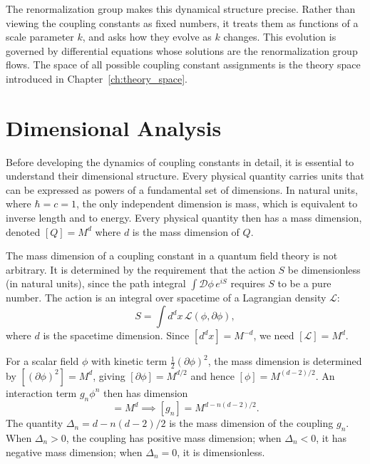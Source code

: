 \documentclass[11pt, twoside, openright]{book}
\theoremstyle{dotted}
\theoremstyle{definition}
\begin{document}
The renormalization group makes this dynamical structure precise. Rather than
viewing the coupling constants as fixed numbers, it treats them as functions of a
scale parameter $k$, and asks how they evolve as $k$ changes. This evolution is
governed by differential equations whose solutions are the renormalization group
flows. The space of all possible coupling constant assignments is the theory space
introduced in Chapter~\ref{ch:theory_space}.

\section{Dimensional Analysis}
\label{sec:dimensional_analysis}

Before developing the dynamics of coupling constants in detail, it is essential to
understand their dimensional structure. Every physical quantity carries units that
can be expressed as powers of a fundamental set of dimensions. In natural units,
where $\hbar = c = 1$, the only independent dimension is mass, which is equivalent
to inverse length and to energy. Every physical quantity then has a mass dimension,
denoted $[Q] = M^d$ where $d$ is the mass dimension of $Q$.

The mass dimension of a coupling constant in a quantum field theory is not
arbitrary. It is determined by the requirement that the action $S$ be dimensionless
(in natural units), since the path integral $\int \mathcal{D}\phi \, e^{iS}$
requires $S$ to be a pure number. The action is an integral over spacetime of a
Lagrangian density $\mathcal{L}$:
\begin{equation}
  S = \int d^dx \, \mathcal{L}(\phi, \partial\phi),
\end{equation}
where $d$ is the spacetime dimension. Since $[d^dx] = M^{-d}$, we need
$[\mathcal{L}] = M^d$.

For a scalar field $\phi$ with kinetic term $\frac{1}{2}(\partial\phi)^2$, the
mass dimension is determined by $[(\partial\phi)^2] = M^d$, giving
$[\partial\phi] = M^{d/2}$ and hence $[\phi] = M^{(d-2)/2}$. An interaction term
$g_n \phi^n$ then has dimension
\begin{equation}
  [g_n \phi^n] = M^d \implies [g_n] = M^{d - n(d-2)/2}.
  \label{eq:coupling_dimension}
\end{equation}
The quantity $\Delta_n = d - n(d-2)/2$ is the mass dimension of the coupling $g_n$.
When $\Delta_n > 0$, the coupling has positive mass dimension; when $\Delta_n < 0$,
it has negative mass dimension; when $\Delta_n = 0$, it is dimensionless.
\end{document}
